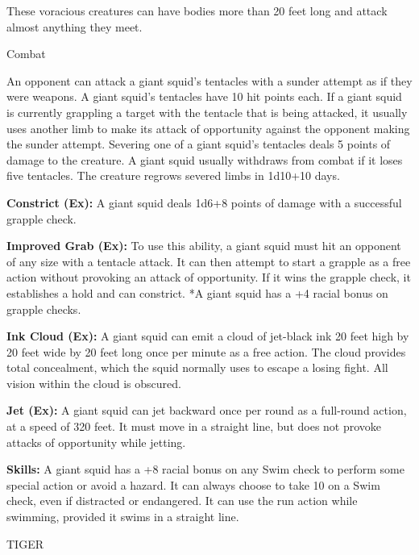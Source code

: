 \documentclass{article}
\begin{document}
These voracious creatures can have bodies more than 20 feet long and attack almost 
anything they meet.

Combat

An opponent can attack a giant squid's tentacles with a sunder attempt as if they 
were weapons. A giant squid's tentacles have 10 hit points each. If a giant squid 
is currently grappling a target with the tentacle that is being attacked, it usually 
uses another limb to make its attack of opportunity against the opponent making 
the sunder attempt. Severing one of a giant squid's tentacles deals 5 points of 
damage to the creature. A giant squid usually withdraws from combat if it loses 
five tentacles. The creature regrows severed limbs in 1d10+10 days.

\textbf{Constrict (Ex): }A giant squid deals 1d6+8 points of damage with a successful 
grapple check.

\textbf{Improved Grab (Ex): }To use this ability, a giant squid must hit an opponent 
of any size with a tentacle attack. It can then attempt to start a grapple as a 
free action without provoking an attack of opportunity. If it wins the grapple 
check, it establishes a hold and can constrict. *A giant squid has a +4 racial 
bonus on grapple checks.

\textbf{Ink Cloud (Ex): }A giant squid can emit a cloud of jet-black ink 20 feet 
high by 20 feet wide by 20 feet long once per minute as a free action. The cloud 
provides total concealment, which the squid normally uses to escape a losing fight. 
All vision within the cloud is obscured.

\textbf{Jet (Ex): }A giant squid can jet backward once per round as a full-round 
action, at a speed of 320 feet. It must move in a straight line, but does not provoke 
attacks of opportunity while jetting.

\textbf{Skills:} A giant squid has a +8 racial bonus on any Swim check to perform 
some special action or avoid a hazard. It can always choose to take 10 on a Swim 
check, even if distracted or endangered. It can use the run action while swimming, 
provided it swims in a straight line.

\vspace{12pt}
TIGER
\end{document}
